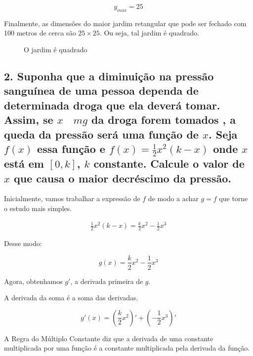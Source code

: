 \documentclass{article}
\begin{document}
\begin{equation}\label{eq:q1_y_max}
    y_{max} = 25
\end{equation}

Finalmente, as dimensões do maior jardim retangular que pode ser
fechado com 100 metros de cerca são \(25 \times 25\). Ou seja, tal jardim é quadrado.

\begin{figure}[H]
    \centering

    \caption{O jardim é quadrado}
\end{figure}

\subsection*{
    2. Suponha que a diminuição na pressão sanguínea de uma pessoa
    dependa de determinada droga que ela deverá tomar. Assim, se \(x \quad mg\) da
    droga forem tomados , a queda da pressão será uma função de \(x\).
    Seja \(f(x)\) essa função e \(f(x) = \frac{1}{2}x^2(k-x)\) onde \(x\) está
    em \([0,k]\), \(k\) constante.
    Calcule o valor de \(x\) que causa o maior decréscimo da pressão.
}

Inicialmente, vamos trabalhar a expressão de \(f\) de modo a achar \(g = f\)
que torne o estudo mais simples.

\begin{align*}
    \frac{1}{2}x^2(k-x) = \frac{k}{2}x^2 - \frac{1}{2}x^3
\end{align*}

Desse modo:

\begin{equation}
    g(x) = \frac{k}{2}x^2 - \frac{1}{2}x^3
\end{equation}

Agora, obtenhamos \(g'\), a derivada primeira de \(g\).

A derivada da soma é a soma das derivadas.

\[
    g'(x) = \left(\frac{k}{2}x^2\right)' + \left(-\frac{1}{2}x^3\right)'
\]

A Regra do Múltiplo Constante diz que a derivada de uma constante multiplicada
por uma função é a constante multiplicada pela derivada da função.
\end{document}
